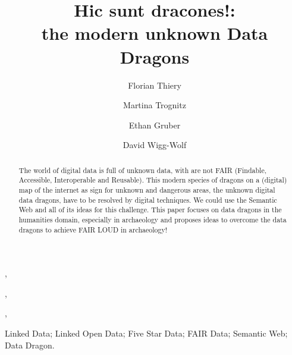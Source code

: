 \documentclass[twocolumn]{autart}
\begin{document}

\begin{frontmatter}

\title{Hic sunt dracones!: \protect\\ the modern unknown Data Dragons}
                                               

\author[FT]{Florian Thiery},\author[MT]{Martina Trognitz},\author[EG]{Ethan Gruber},\author[DWW]{David Wigg-Wolf}

\address[FT]{ORCID: 0000-0002-3246-3531 \protect\\ R\"omisch-Germanisches Zentralmuseum, Mainz, Germany}                                        

\address[MT]{ORCID: 0000-0003-0485-6861 \protect\\ Austrian Centre for Digital Humanities at Austrian Academy of Sciences, Austria}

\address[EG]{ORCID: 0000-0002-4691-9747 \protect\\ American Numismatic Society, USA}

\address[DWW]{ORCID: 0000-0002-8604-544X \protect\\ R\"omisch-Germanische Kommission des Deutschen Arch\"aologischen Instituts, Germany}

          
\begin{keyword}                             
Linked Data; Linked Open Data; Five Star Data; FAIR Data; Semantic Web; Data Dragon. 
\end{keyword}

\begin{abstract}                         

The world of digital data is full of unknown data, with are not FAIR (Findable, Accessible, Interoperable and Reusable). This modern species of dragons on a (digital) map of the internet as sign for unknown and dangerous areas, the unknown digital data dragons, have to be resolved by digital techniques. We could use the Semantic Web and all of its ideas for this challenge. This paper focuses on data dragons in the humanities domain, especially in archaeology and proposes ideas to overcome the data dragons to achieve FAIR LOUD in archaeology!

\end{abstract}

\end{frontmatter}
\end{document}
